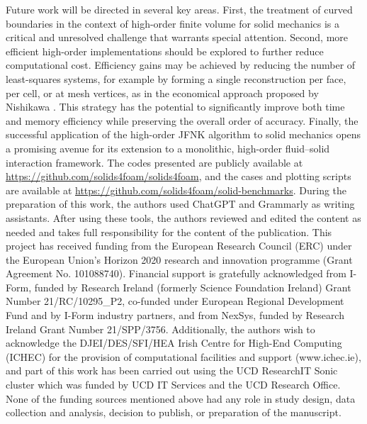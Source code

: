 \documentclass[sn-mathphys,Numbered]{sn-jnl}%
\begin{document}
Future work will be directed in several key areas. First, the treatment of curved boundaries in the context of high-order finite volume for solid mechanics is a critical and unresolved challenge that warrants special attention. 
Second, more efficient high-order implementations should be explored to further reduce computational cost. Efficiency gains may be achieved by reducing the number of least-squares systems, for example by forming a single reconstruction per face, per cell, or at mesh vertices, as in the economical approach proposed by Nishikawa \cite{Nishikawa2025}. This strategy has the potential to significantly improve both time and memory efficiency while preserving the overall order of accuracy.
Finally, the successful application of the high-order JFNK algorithm to solid mechanics opens a promising avenue for its extension to a monolithic, high-order fluid–solid interaction framework.
%
%
%
\backmatter
%
%
The codes presented are publicly available at \url{https://github.com/solids4foam/solids4foam}, and the cases and plotting scripts are available at \url{https://github.com/solids4foam/solid-benchmarks}.
%
%
During the preparation of this work, the authors used ChatGPT and Grammarly as writing assistants.
After using these tools, the authors reviewed and edited the content as needed and takes full responsibility for the content of the publication.
%
%
This project has received funding from the European Research Council (ERC) under the European Union’s Horizon 2020 research and innovation programme (Grant Agreement No. 101088740).
Financial support is gratefully acknowledged from I-Form, funded by Research Ireland (formerly Science Foundation Ireland)
Grant Number {21/RC/10295\_P2}, co-funded under European Regional Development Fund and by I-Form industry partners, and from NexSys, funded by Research Ireland Grant Number 21/SPP/3756.
Additionally, the authors wish to acknowledge the DJEI/DES/SFI/HEA Irish Centre for High-End Computing (ICHEC) for the provision of computational facilities and support (www.ichec.ie), and part of this work has been carried out using the UCD ResearchIT Sonic cluster which was funded by UCD IT Services and the UCD Research Office. None of the funding sources mentioned above had any role in study design, data collection and analysis, decision to publish, or preparation of the manuscript.
\end{document}
